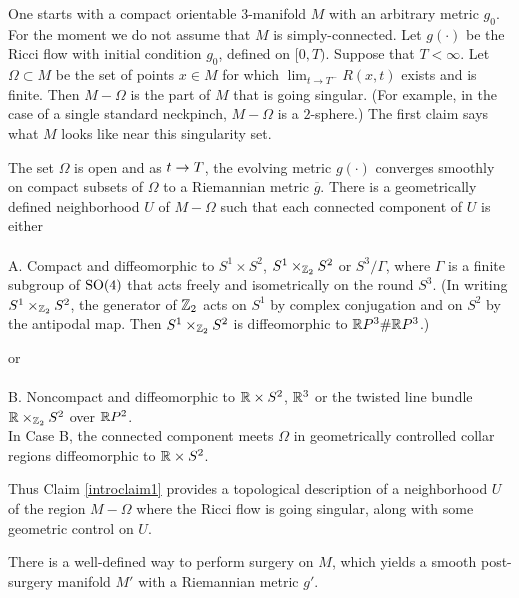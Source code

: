 One starts with a compact orientable $3$-manifold $M$ with an
arbitrary metric $g_0$. For the moment we do not assume that
$M$ is simply-connected. Let $g(\cdot)$ be the Ricci flow
with initial condition $g_0$, defined on $[0,T)$.
Suppose that $T <\infty$.   Let $\Omega \subset M$ be
the set of points $x \in M$ for which
$\lim_{t \rightarrow T^-} R(x,t) $ exists
and is finite.
Then $M - \Omega$ is the part of $M$ that is going singular.
(For example, in the case of a single standard neckpinch, $M - \Omega$
is a $2$-sphere.) The first claim says what $M$ looks like
near this singularity set.

\begin{proposition}
  \label{prop:kl-overview-ricci-flow-approach-manifold-geometrization-existence-riemannian-metrics}
 \cite{Perelman2} \label{introclaim1}
The set $\Omega$ is  open and as $t\rightarrow T$, the evolving metric
$g(\cdot)$ converges smoothly
on compact subsets of $\Omega$ to
a Riemannian metric $\overline{g}$.
There is a geometrically defined neighborhood
$U$ of $M - \Omega$ such that each connected component of $U$
is either \\ \\
\noindent
A. Compact and diffeomorphic to $S^1 \times S^2$,
$S^1 \times_{{\mathbb Z}_2} S^2$ or $S^3/\Gamma$, where $\Gamma$ is a finite
subgroup of $\operatorname{SO}(4)$ that acts freely and isometrically on the round $S^3$.
(In writing $S^1 \times_{{\mathbb Z}_2} S^2$, the generator of ${\mathbb Z}_2$ acts on
$S^1$ by complex conjugation and on $S^2$ by the antipodal map.
Then $S^1 \times_{{\mathbb Z}_2} S^2$ is diffeomorphic to ${\mathbb R} P^3 \# {\mathbb R} P^3$.)

or \\ \\
\noindent
B. Noncompact and diffeomorphic to ${\mathbb R}\times S^2$,
${\mathbb R}^3$
or the twisted line
bundle ${\mathbb R} \times_{{\mathbb Z}_2} S^2$ over ${\mathbb R} P^2$.  \\

In Case B, the connected component meets $\Omega$ in
geometrically controlled collar regions diffeomorphic to ${\mathbb R}\times S^2$.
\end{proposition}

Thus Claim \ref{introclaim1} provides a topological description of
a neighborhood $U$ of the region
$M-\Omega$ where the Ricci flow is going singular, along with some
geometric control on $U$.


\begin{proposition}
  \label{prop:kl-overview-ricci-flow-approach-manifold-geometrization-existence-ricci-flow-surgery}
 \cite{Perelman2} \label{introclaim2}
There is a well-defined way
to perform surgery on $M$, which yields a smooth  post-surgery
manifold $M'$ with a Riemannian metric $g'$.
\end{proposition}

